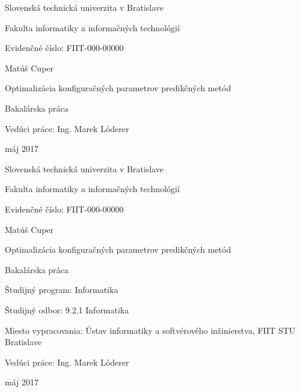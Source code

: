\documentclass[a4paper,slovak,12pt,appendix]{article}
\begin{document}
\begin{titlepage}
	\centering
	{\Large Slovenská technická univerzita v Bratislave \par}
	{\Large Fakulta informatiky a informačných technológií \par}
  \vspace{0.5cm}
  {\normalsize Evidenčné číslo: FIIT-000-00000 \par}
	\vspace{7cm}
  {\large Matúš Cuper \par}
  \vspace{0.5cm}
	{\LARGE Optimalizácia konfiguračných parametrov predikčných metód \par}
	\vspace{0.5cm}
	{\large Bakalárska práca \par}
	\vspace{7cm}
  \flushleft
	{\large Vedúci práce: Ing. Marek Lóderer \par}
  \vspace{0.5cm}
  {\large máj 2017 \par}
	\vfill
\end{titlepage}

\begin{titlepage}
	\centering
  {\Large Slovenská technická univerzita v Bratislave \par}
	{\Large Fakulta informatiky a informačných technológií \par}
  \vspace{0.5cm}
  {\normalsize Evidenčné číslo: FIIT-000-00000 \par}
	\vspace{7cm}
  {\large Matúš Cuper \par}
  \vspace{0.5cm}
	{\LARGE Optimalizácia konfiguračných parametrov predikčných metód \par}
	\vspace{0.5cm}
	{\large Bakalárska práca \\}
	\vspace{7cm}
  \flushleft
  {\normalsize Študijný program: Informatika \par}
	{\normalsize Študijný odbor: 9.2.1 Informatika \par}
	{\normalsize Miesto vypracovania: Ústav informatiky a softvérového inžinierstva, FIIT STU Bratislave \par}
	{\normalsize Vedúci práce: Ing. Marek Lóderer \par}
  \vspace{0.5cm}
  {\normalsize máj 2017 \par}
\end{titlepage}
\end{document}
